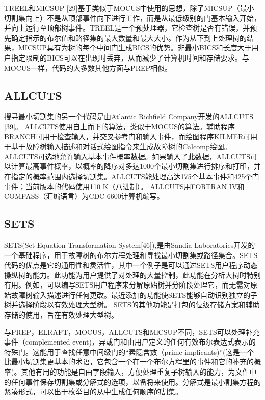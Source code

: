 \documentclass[cn,11pt,chinese]{elegantbook}
\begin{document}
{TREEL和MICSUP [29]基于类似于MOCUS中使用的思想，除了MICSUP（最小切割集向上）不是从顶部事件向下进行工作，而是从最低级别的门基本输入开始，并向上运行至顶部树事件。TREEL是一个预处理器，它检查树是否有错误，并预先确定指示的布尔值和路径集的最大数量和最大大小。作为从下到上处理树的结果，MICSUP具有为树的每个中间门生成BICS的优势。非最小BICS和长度大于用户指定限制的BICS可以在出现时丢弃，从而减少了计算机时间和存储要求。与MOCUS一样，代码的大多数其他方面与PREP相似。

\subsection{ALLCUTS}

搜寻最小切割集的另一个代码是由Atlantic Richfield Company开发的ALLCUTS [39]。 ALLCUTS使用自上而下的算法，类似于MOCUS的算法。辅助程序BRANCH可用于检查输入，并交叉参考门和输入事件，而绘图程序KILMER可用于基于故障树输入描述和对话式绘图指令来生成故障树的Calcomp绘图。 ALLCUTS可选地允许输入基本事件概率数据。如果输入了此数据，ALLCUTS可以计算最高事件概率，以概率的降序对多达1000个最小切割集进行排序和打印，并在指定的概率范围内选择切割集。ALLCUTS能处理高达175个基本事件和425个门事件；当前版本的代码使用110 K（八进制）。 ALLCUTS用FORTRAN IV和COMPASS（汇编语言）为CDC 6600计算机编写。

\subsection{SETS}

SETS(Set Equation Transformation System[46]),是由Sandia Laboratories开发的一个基础程序，用于故障树的布尔方程处理和寻找最小切割集或路径集合。SETS代码的优点是它的通用性和灵活性，其中一个例子是可以通过SETS用户程序动态操纵树的能力。此功能为用户提供了对处理的大量控制，此功能在分析大树时特别有用。例如，可以编写SETS用户程序来分解原始树并分阶段处理它，而无需对原始故障树输入描述进行任何更改。最近添加的功能使SETS能够自动识别独立的子树并选择阶段以有效处理大型树。 SETS的其他功能是打包的位级存储方案和辅助存储的使用，旨在有效处理大型树。

与PREP，ELRAFT，MOCUS，ALLCUTS和MlCSUP不同，SETS可以处理补充事件（complemented event)，异或门和由用户定义的任何有效布尔表达式表示的特殊门。这能用于查找任意中间级门的“素隐含数（prime implicants)”(这是一个比最小切割集更基本的术语，它包含一个在一个布尔方程里的事件和它的补充的概率)。其他有用的功能是自由字段输入，方便处理重复子树输入的能力，为文件中的任何事件保存切割集或分解式的选项，以备将来使用。分解式是最小割集方程的紧凑形式，可以出于枚举目的从中生成任何顺序的割集。

}
\end{document}
